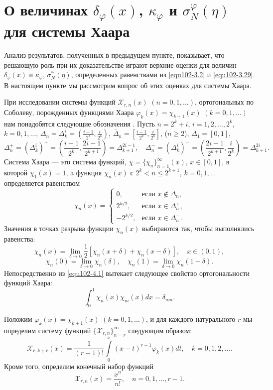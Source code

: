 \section{О величинах $\delta_\varphi(x)$, $\kappa_\varphi$ и $\sigma_N^\varphi(\eta)$ для системы Хаара }

Анализ результатов, полученных в предыдущем пункте, показывает, что решающую роль
при их доказательстве играют верхние оценки для величин $\delta_\varphi(x)$ и $\kappa_\varphi$, $\sigma_N^\varphi(\eta)$, определенных равенствами из \eqref{equ102-3.2} и \eqref{equ102-3.29}.  В настоящем пункте мы рассмотрим вопрос об этих оценках для   системы Хаара.

При исследовании системы функций $\mathcal{ X}_{r,n}(x)$ $(n=0,1,\ldots)$, ортогональных по Соболеву, порожденных функциями  Хаара $\varphi_k(x)=\chi_{k+1}(x)$ $(k=0,1,\ldots)$ нам понадобятся следующие обозначения \cite{equ102-KashSaak}. Пусть $n=2^k+i$, $i=1,2,\ldots, 2^k$,  $k=0,1,\ldots$,
$\Delta_n=\Delta_k^i=(\frac{i-1}{2^k},\frac{i}{2^k})$, $\bar\Delta_n=[\frac{i-1}{2^k},\frac{i}{2^k}]$, ($n\ge2$), $\Delta_1=[0,1]$,
$$
 \Delta_n^+=(\Delta_k^i)^+=(\frac{i-1}{2^k},\frac{2i-1}{2^{k+1}})=\Delta_{k+1}^{2i-1}, \quad \Delta_n^-=(\Delta_k^i)^-=(\frac{2i-1}{2^{k+1}},\frac{i}{2^{k}})=\Delta_{k+1}^{2i}.
$$
Система Хаара --- это система функций, $\chi=\{\chi_n\}_{n=1}^\infty(x)$, $x\in[0,1]$, в которой $\chi_1(x)=1$, a функция $\chi_n(x)$
с $2^k<n\le 2^{k+1}$, $k=0,1,\ldots$ определяется равенством
\begin{equation}\label{equ102-4.1}
\chi_n(x)=\begin{cases} 0,&\text{если $x\notin \bar\Delta_n$,}\\
2^{k/2},& \text{если $x\in \Delta_n^+$,}\\
-2^{k/2},& \text{если $x\in \Delta_n^-$.}
\end{cases}
\end{equation}
Значения в точках разрыва функции $\chi_n(x)$ выбираются так, чтобы выполнялись равенства:
$$
\chi_n(x)=\lim_{\delta\to0}\frac12[\chi_n(x+\delta)+\chi_n(x-\delta)],\quad x\in (0,1),
$$
$$
\chi_n(0)=\lim_{\delta\to0} \chi_n(\delta),\quad \chi_n(1)=\lim_{\delta\to0} \chi_n(1-\delta).
$$
Непосредственно из \eqref{equ102-4.1} вытекает следующее свойство ортогональности функций Хаара:
\begin{equation}\label{equ102-4.2}
\int_0^1\chi_n(x)\chi_m(x)dx=\delta_{nm}.
\end{equation}


Положим $\varphi_k(x)=\chi_{k+1}(x)$ $(k=0,1,\ldots)$, и для каждого натурального $r$ мы определим систему функций $\{\mathcal{ X}_{r,n}\}_{n=r}^\infty$ следующим образом:
\begin{equation}\label{equ102-4.3}
\mathcal{ X}_{r,k+r}(x) =\frac{1}{(r-1)!}\int\limits_0^x(x-t)^{r-1}\varphi_k(x)dt, \quad k=0,1, 2, \ldots.
\end{equation}
 Кроме того, определим конечный набор функций
  \begin{equation}\label{equ102-4.4}
\mathcal{ X}_{r,n}(x) =\frac{x^n}{n!}, \quad n=0,1,\ldots, r-1.
\end{equation}

